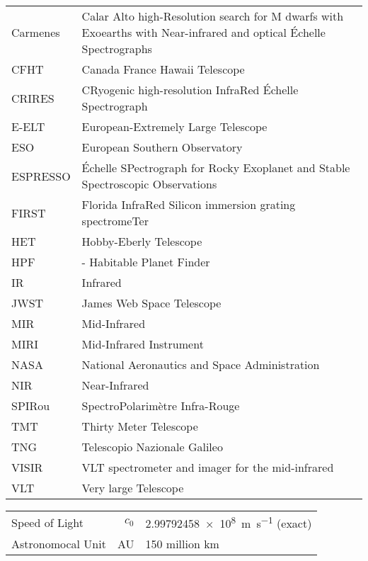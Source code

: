 \documentclass[fleqn]{fcup-thesis}
\begin{document}
\begin{preliminary}
\begin{abbreviations}
\begin{longtable}{ll}
				Carmenes & Calar Alto high-Resolution search for M dwarfs with Exoearths with Near-infrared and optical \'Echelle Spectrographs \\
				CFHT & Canada France Hawaii Telescope \\
				CRIRES & CRyogenic high-resolution InfraRed \'Echelle Spectrograph \\
				E-ELT & European-Extremely Large Telescope \\
				ESO & European Southern Observatory \\
				ESPRESSO & \'Echelle SPectrograph for Rocky Exoplanet and Stable Spectroscopic Observations\\
				FIRST & Florida InfraRed Silicon immersion grating spectromeTer \\
				HET & Hobby-Eberly Telescope \\
				HPF &- Habitable Planet Finder \\
				IR & Infrared\\
				JWST & James Web Space Telescope \\
				MIR & Mid-Infrared \\
				MIRI & Mid-Infrared Instrument\\
				NASA & National Aeronautics and Space Administration \\
				NIR & Near-Infrared \\
				SPIRou & SpectroPolarim\`etre Infra-Rouge\\
				TMT & Thirty Meter Telescope\\
				TNG & Telescopio Nazionale Galileo \\
				VISIR &  VLT spectrometer and imager for the mid-infrared \\
				VLT & Very large Telescope \\
				
			\end{longtable}		
		\end{abbreviations}
		
		\begin{constants}
			\begin{longtable}{lr@{${}={}$}l}
				 
				 Speed of Light & $c_{0}$ & \SI{2.99792458e8}{\meter\per\second} (exact)\\
				 Astronomocal Unit & AU & 150 million km\\
			\end{longtable}
		\end{constants}
		

\end{preliminary}
\end{document}
